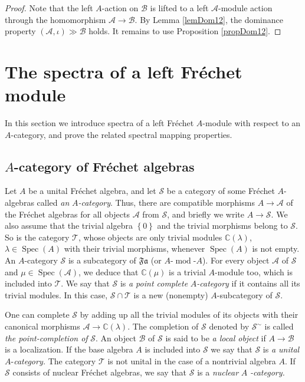 \documentclass[12pt]{amsart}%
\theoremstyle{plain}
\numberwithin{equation}{section}
\numberwithin{equation}{section}
\numberwithin{theorem}{section}
\numberwithin{lemma}{section}
\numberwithin{remark}{section}
\numberwithin{example}{section}
\numberwithin{proposition}{section}
\numberwithin{definition}{section}
\numberwithin{corollary}{section}
\begin{document}
\begin{proof}
Note that the left $A$-action on $\mathcal{B}$ is lifted to a left
$\mathcal{A}$-module action through the homomorphism $\mathcal{A\rightarrow
B}$. By Lemma \ref{lemDom12}, the dominance property $\left(  \mathcal{A}%
,\iota\right)  \gg\mathcal{B}$ holds. It remains to use Proposition
\ref{propDom12}.
\end{proof}

\section{The spectra of a left Fr\'{e}chet module\label{sectionFM}}

In this section we introduce spectra of a left Fr\'{e}chet $A$-module with
respect to an $A$-category, and prove the related spectral mapping properties.

\subsection{$A$-category of Fr\'{e}chet algebras}

Let $A$ be a unital Fr\'{e}chet algebra, and let $\mathcal{S}$ be a category
of some Fr\'{e}chet $A$-algebras called\textit{ an }$A$\textit{-category}.
Thus, there are compatible morphisms $A\rightarrow\mathcal{A}$ of the
Fr\'{e}chet algebras for all objects $\mathcal{A}$ from $\mathcal{S}$, and
briefly we write $A\rightarrow\mathcal{S}$. We also assume that the trivial
algebra $\left\{  0\right\}  $ and the trivial morphisms belong to
$\mathcal{S}$. So is the category $\mathcal{T}$, whose objects are only
trivial modules $\mathbb{C}\left(  \lambda\right)  $, $\lambda\in
\operatorname{Spec}\left(  A\right)  $ with their trivial morphisms, whenever
$\operatorname{Spec}\left(  A\right)  $ is not empty. An $A$-category
$\mathcal{S}$ is a subcategory of $\mathfrak{Fa}$ (or $A$-$\operatorname{mod}%
$-$A$). For every object $\mathcal{A}$ of $\mathcal{S}$ and $\mu
\in\operatorname{Spec}\left(  \mathcal{A}\right)  $, we deduce that
$\mathbb{C}\left(  \mu\right)  $ is a trivial $A$-module too, which is
included into $\mathcal{T}$. We say that $\mathcal{S}$ is \textit{a point
complete }$A$\textit{-category }if it contains all its trivial modules. In
this case, $\mathcal{S\cap T}$ is a new (nonempty) $A$-subcategory of
$\mathcal{S}$.

One can complete $\mathcal{S}$ by adding up all the trivial modules of its
objects with their canonical morphisms $\mathcal{A}\rightarrow\mathbb{C}%
\left(  \lambda\right)  $. The completion of $\mathcal{S}$ denoted by
$\mathcal{S}^{\sim}$ is called \textit{the point-completion of }$\mathcal{S}$.
An object $\mathcal{B}$ of $\mathcal{S}$ is said to be \textit{a local object
}if $A\rightarrow\mathcal{B}$ is a localization. If the base algebra $A$ is
included into $\mathcal{S}$ we say that $\mathcal{S}$ is \textit{a unital }%
$A$-\textit{category. }The category $\mathcal{T}$ is not unital in the case of
a nontrivial algebra $A$. If $\mathcal{S}$ consists of nuclear Fr\'{e}chet
algebras, we say that $\mathcal{S}$ is a \textit{nuclear }$A$%
\textit{-category. }
\end{document}

